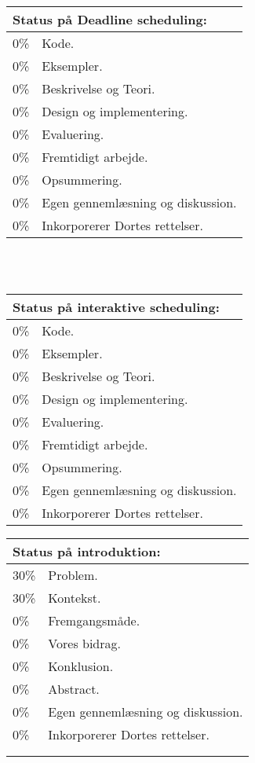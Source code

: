 \quad
\begin{tabular}{m{0.5cm}m{5cm}}
\hline  
\multicolumn{2}{m{4.5cm}}{\textbf{Status på Deadline scheduling:}} \\
\hline
0\% & Kode.  \\ 
0\% & Eksempler.\\
0\% & Beskrivelse og Teori.\\
0\% & Design og  implementering. \\
0\% & Evaluering. \\
0\% & Fremtidigt arbejde. \\
0\% & Opsummering. \\ 
0\% & Egen gennemlæsning og diskussion. \\ 
0\% & Inkorporerer Dortes rettelser. \\ 
\hline
\end{tabular}\\\vspace{1cm}\\
\begin{tabular}{m{0.5cm}m{5cm}}
\hline  
\multicolumn{2}{m{4.5cm}}{\textbf{Status på interaktive scheduling:}} \\
\hline
0\% & Kode.  \\ 
0\% & Eksempler.\\
0\% & Beskrivelse og Teori.\\
0\% & Design og  implementering. \\
0\% & Evaluering. \\
0\% & Fremtidigt arbejde. \\
0\% & Opsummering. \\ 
0\% & Egen gennemlæsning og diskussion. \\ 
0\% & Inkorporerer Dortes rettelser. \\ 
\hline
\end{tabular}
\quad
\begin{tabular}{m{0.5cm}m{5cm}}
\hline  
\multicolumn{2}{m{4.5cm}}{\textbf{Status på introduktion:}} \\
\hline
30\% & Problem. \\ 
30\% & Kontekst.\\
0\% & Fremgangsmåde.\\
0\% & Vores bidrag. \\
0\% & Konklusion. \\
0\% & Abstract. \\
0\% & Egen gennemlæsning og diskussion. \\ 
0\% & Inkorporerer Dortes rettelser. \\ 
\hline
&\\
&\\
\end{tabular}

